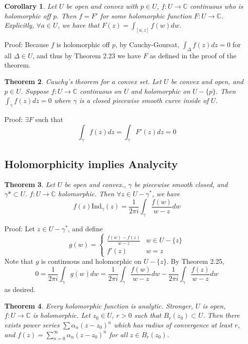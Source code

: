 \documentclass[11pt]{article}
\theoremstyle{plain}
\newtheorem{theorem}{Theorem}[section]
\newtheorem{corollary}[theorem]{Corollary}
\theoremstyle{definition}
\newcommand{\C}{\mathbb{C}}
\newcommand{\Ind}{\text{Ind}}
\begin{document}
\begin{corollary}
Let $U$ be open and convex with $p \in U$, $f:U\to\C$ continuous who is holomorphic off $p$. Then $f = F'$ for some holomorphic function $F: U \to \mathbb{C}$. Explicitly, $\forall a \in U$, we have that $F(z) = \int_{[a,z]} f(w)dw$.
\end{corollary}

Proof: Because $f$ is holomorphic off $p$, by Cauchy-Goursat, $\int_{\Delta} f(z)dz = 0$ for all $\Delta \in U$, and thus by Theorem 2.23 we have $F$ as defined in the proof of the theorem.

\begin{theorem}
Cauchy's theorem for a convex set. Let $U$ be convex and open, and $p \in U$. Suppose $f:U \to \C$ continuous on $U$ and holomorphic on $U - \{p\}$. Then $\int_{\gamma}f(z)dz = 0$ where $\gamma$ is a closed piecewise smooth curve inside of $U$.
\end{theorem}

Proof: $\exists F$ such that 
$$ \int_{\gamma}f(z)dz = \int_{\gamma}F'(z)dz = 0 $$

\subsection{Holomorphicity implies Analycity}

\begin{theorem}
Let $U$ be open and convex., $\gamma$ be piecewise smooth closed, and $\gamma* \subset U$. $f: U \to \C$ holomorphic. Then $\forall z \in U - \gamma^*$, we have 
$$ f(z)\Ind_{\gamma}(z) = \frac{1}{2\pi i}\int_{\gamma}\frac{f(w)}{w - z}dw $$
\end{theorem}

Proof: Let $z \in U - \gamma^*$, and define 
$$ g(w) = \begin{cases} \frac{f(w) - f(z)}{w - z} & w \in U - \{z\} \\ f'(z) & w = z \end{cases} $$
Note that $g$ is continuous and holomorphic on $U - \{z\}$. By Theorem 2.25,
$$ 0 = \frac{1}{2\pi i} \int_{\gamma}g(w)dw = \frac{1}{2\pi i} \int_{\gamma} \frac{f(w)}{w-z}dw - \frac{1}{2\pi i}\int_{\gamma}\frac{f(z)}{w-z}dw $$
as desired.

\begin{theorem}
Every holomorphic function is analytic. Stronger, $U$ is open, $f: U \to \C$ is holomorphic. Let $z_0 \in U$, $r > 0$ such that $B_r(z_0) \subset U$. Then there exists power series $\sum \alpha_n(z - z_0)^n$ which has radius of convergence at least $r$, and $f(z) = \sum_{n=0}^{\infty}\alpha_n(z - z_0)^n$ for all $z \in B_r(z_0)$.
\end{theorem}
\end{document}
